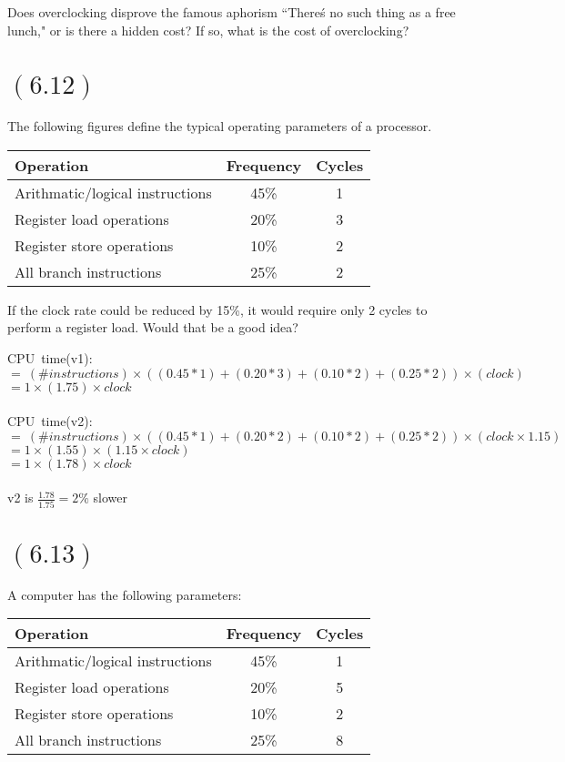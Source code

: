\documentclass[letterpaper,12pt,titlepage]{article}
\begin{document}
Does overclocking disprove the famous aphorism ``There\'s no such thing as a free lunch," or is there a hidden cost? If so, what is the cost of overclocking?

\begin{mdframed}[style=MyFrame]
\end{mdframed}
\newpage
\section*{$(6.12)$} The following figures define the typical operating parameters of a processor.\\
\begin{center}
\begin{tabular}{l | c | c}
\textbf{Operation} & \textbf{Frequency} & \textbf{Cycles}\\ \hline
Arithmatic/logical instructions& 45\% & 1\\
Register load operations& 20\% & 3\\
Register store operations& 10\% & 2\\
All branch instructions& 25\% & 2 \\
\end{tabular}
\end{center}

If the clock rate could be reduced by 15\%, it would require only 2 cycles to perform a register load. Would that be a good idea?
\begin{mdframed}[style=MyFrame]

CPU~time(v1):\\
$=~(\# instructions)\times ((0.45*1)+(0.20*3)+(0.10*2)+(0.25*2))\times (clock)$\\
$=1\times(1.75)\times clock$ \\ \\
CPU~time(v2):\\
$=~(\# instructions)\times ((0.45*1)+(0.20*2)+(0.10*2)+(0.25*2))\times (clock \times 1.15)$\\
$=1\times(1.55)\times (1.15\times clock)$ \\
$=1\times(1.78)\times clock$ \\ \\
v2 is $\frac{1.78}{1.75} = 2\% $ slower
\end{mdframed}

\section*{$(6.13)$} A computer has the following parameters:\\
\begin{center}
\begin{tabular}{l | c | c}
\textbf{Operation} & \textbf{Frequency} & \textbf{Cycles}\\ \hline
Arithmatic/logical instructions& 45\% & 1\\
Register load operations& 20\% & 5\\
Register store operations& 10\% & 2\\
All branch instructions& 25\% & 8 \\
\end{tabular}
\end{center}
\end{document}
